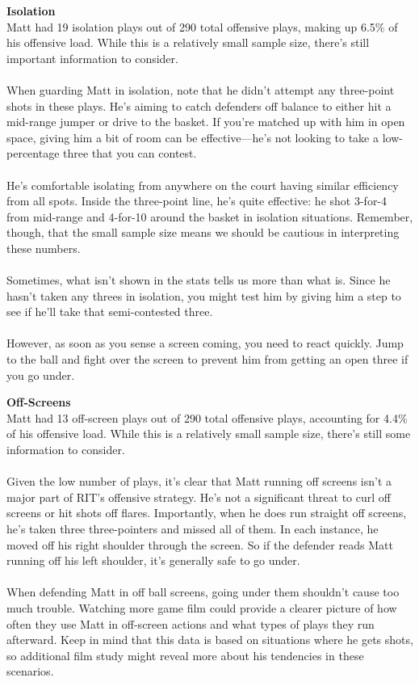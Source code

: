 \documentclass[a4paper,12pt]{article}
\begin{document}
\begin{multicols}{2}
    {\large \noindent \textbf{Isolation}} \\
    Matt had 19 isolation plays out of 290 total offensive plays, making up 6.5\% of his offensive load. While this is a relatively small sample size, there's still important information to consider. \\ \\
    When guarding Matt in isolation, note that he didn't attempt any three-point shots in these plays. He's aiming to catch defenders off balance to either hit a mid-range jumper or drive to the basket. If you're matched up with him in open space, giving him a bit of room can be effective—he's not looking to take a low-percentage three that you can contest. \\ \\
    He's comfortable isolating from anywhere on the court having similar efficiency from all spots. Inside the three-point line, he's quite effective: he shot 3-for-4 from mid-range and 4-for-10 around the basket in isolation situations. Remember, though, that the small sample size means we should be cautious in interpreting these numbers. \\ \\
    Sometimes, what isn't shown in the stats tells us more than what is. Since he hasn't taken any threes in isolation, you might test him by giving him a step to see if he'll take that semi-contested three. \\ \\
    However, as soon as you sense a screen coming, you need to react quickly. Jump to the ball and fight over the screen to prevent him from getting an open three if you go under. \vspace{1em}
    
    {\large \noindent \textbf{Off-Screens}} \\
    Matt had 13 off-screen plays out of 290 total offensive plays, accounting for 4.4\% of his offensive load. While this is a relatively small sample size, there's still some information to consider. \\ \\
    Given the low number of plays, it's clear that Matt running off screens isn't a major part of RIT's offensive strategy. He's not a significant threat to curl off screens or hit shots off flares. Importantly, when he does run straight off screens, he's taken three three-pointers and missed all of them. In each instance, he moved off his right shoulder through the screen. So if the defender reads Matt running off his left shoulder, it's generally safe to go under.\\ \\
    When defending Matt in off ball screens, going under them shouldn't cause too much trouble. Watching more game film could provide a clearer picture of how often they use Matt in off-screen actions and what types of plays they run afterward. Keep in mind that this data is based on situations where he gets shots, so additional film study might reveal more about his tendencies in these scenarios. \vspace{1em}
    

\end{multicols}
\end{document}
